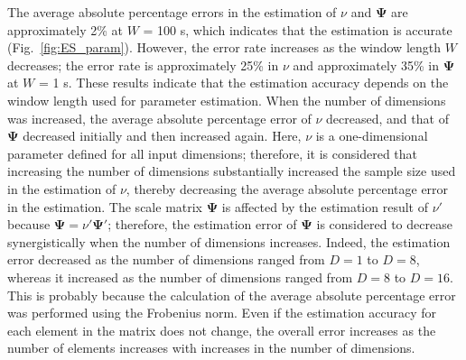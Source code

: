 \documentclass[journal]{IEEEtran}
\begin{document}
The average absolute percentage errors in the estimation of $\nu$ and $\mathbf{\Psi}$ are approximately 2\% at $W$ = 100 s, which indicates that the estimation is accurate (Fig.~\ref{fig:ES_param}).
However, the error rate increases as the window length $W$ decreases; the error rate is approximately 25\% in $\nu$ and approximately 35\% in $\mathbf{\Psi}$ at $W$ = 1 s.
These results indicate that the estimation accuracy depends on the window length used for parameter estimation. 
When the number of dimensions was increased, the average absolute percentage error of $\nu$ decreased, and that of $\mathbf{\Psi}$ decreased initially and then increased again. 
Here, $\nu$ is a one-dimensional parameter defined for all input dimensions; therefore, it is considered that increasing the number of dimensions substantially increased the sample size used in the estimation of $\nu$, thereby decreasing the average absolute percentage error in the estimation. 
The scale matrix $\mathbf{\Psi}$ is affected by the estimation result of $\nu'$ because $\mathbf{\Psi} = \nu' \mathbf{\Psi}'$; therefore, the estimation error of $\mathbf{\Psi}$ is considered to decrease synergistically when the number of dimensions increases. 
Indeed, the estimation error decreased as the number of dimensions ranged from $D = 1$ to $D = 8$, whereas it increased as the number of dimensions ranged from $D = 8$ to $D = 16$.
This is probably because the calculation of the average absolute percentage error was performed using the Frobenius norm. Even if the estimation accuracy for each element in the matrix does not change, the overall error increases as the number of elements increases with increases in the number of dimensions.
\end{document}
